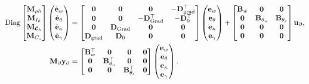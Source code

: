 \begin{equation}
\begin{aligned}
\mathrm{Diag}\begin{bmatrix}
\mathbf{M}_{\rho h}\\
\mathbf{M}_{I_\theta}\\
\mathbf{M}_{\bm{\mathcal{C}}_b}\\
\mathbf{M}_{{C}_s} \\
\end{bmatrix}
\begin{pmatrix}
\dot{\mathbf{e}}_{w} \\
\dot{\mathbf{e}}_{\theta} \\
\dot{\mathbf{e}}_{\kappa} \\
\dot{\mathbf{e}}_{\gamma} \\
\end{pmatrix}
&= \begin{bmatrix}
\mathbf{0} & \mathbf{0} & \mathbf{0} & -\mathbf{D}_{\operatorname*{grad}}^\top \\
\mathbf{0} & \mathbf{0} & -\mathbf{D}_{\operatorname*{Grad}}^\top & -\mathbf{D}_{0}^\top \\
\mathbf{0} & \mathbf{D}_{\operatorname*{Grad}} & \mathbf{0} & \mathbf{0}\\
\mathbf{D}_{\operatorname*{grad}} & \mathbf{D}_{0} & \mathbf{0} & \mathbf{0}\\
\end{bmatrix} 
\begin{pmatrix}
{\mathbf{e}}_{w} \\
{\mathbf{e}}_{\theta} \\
{\mathbf{e}}_{\kappa} \\
{\mathbf{e}}_{\gamma} \\
\end{pmatrix} + 
\begin{bmatrix}
\mathbf{B}_w & \mathbf{0} & \mathbf{0} \\
\mathbf{0} & \mathbf{B}_{\theta_n} & \mathbf{B}_{\theta_s}\\
\mathbf{0} & \mathbf{0} & \mathbf{0} \\
\mathbf{0} & \mathbf{0} & \mathbf{0} \\
\end{bmatrix}
\mathbf{u}_\partial, \\
\mathbf{M}_\partial {\mathbf{y}_\partial} &= \begin{bmatrix}
\mathbf{B}_w^\top & \mathbf{0} & \mathbf{0} & \mathbf{0} \\
\mathbf{0} & \mathbf{B}_{\theta_n}^\top & \mathbf{0} & \mathbf{0}\\ 
\mathbf{0} & \mathbf{0} & \mathbf{B}_{\theta_s}^\top & \mathbf{0}\\
\end{bmatrix}
\begin{pmatrix}
{\mathbf{e}}_{w} \\
{\mathbf{e}}_{\theta} \\
{\mathbf{e}}_{\kappa} \\
{\mathbf{e}}_{\gamma} \\
\end{pmatrix}.
\end{aligned}
\end{equation}
